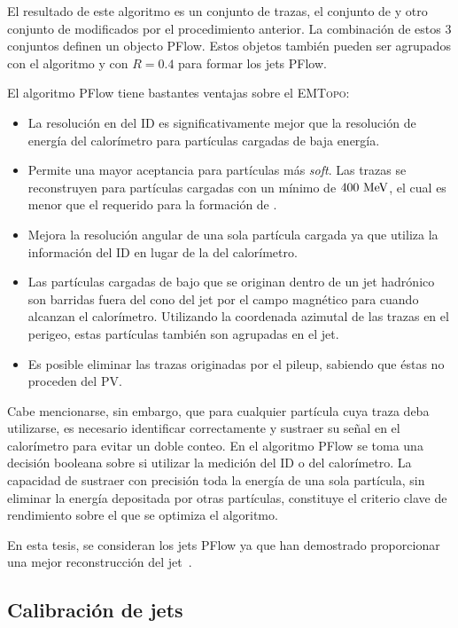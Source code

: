 El resultado de este algoritmo es un conjunto de trazas, el conjunto de \topos y otro conjunto de \topos modificados por el procedimiento anterior. La combinación de estos 3 conjuntos definen un objecto \ac{PFlow}. Estos objetos también pueden ser agrupados con el algoritmo \antikt y con \(R=0.4\) para formar los jets \ac{PFlow}.

El algoritmo \ac{PFlow} tiene bastantes ventajas sobre el \textsc{EMTopo}:
\begin{itemize}
    \item La resolución en \pt del \ac{ID} es significativamente mejor que la resolución de energía del calorímetro para partículas cargadas de baja energía.
    \item Permite una mayor aceptancia para partículas más \textit{soft}. Las trazas se reconstruyen para partículas cargadas con un mínimo \pt de \(400~\text{MeV}\), el cual es menor que el requerido para la formación de \topos.
    \item Mejora la resolución angular de una sola partícula cargada ya que utiliza la información del \ac{ID} en lugar de la del calorímetro.
    \item Las partículas cargadas de bajo \pt que se originan dentro de un jet hadrónico son barridas fuera del cono del jet por el campo magnético para cuando alcanzan el calorímetro. Utilizando la coordenada azimutal de las trazas en el perigeo, estas partículas también son agrupadas en el jet.
    \item Es posible eliminar las trazas originadas por el pileup, sabiendo que éstas no proceden del \ac{PV}.
\end{itemize}

Cabe mencionarse, sin embargo, que para cualquier partícula cuya traza deba utilizarse, es necesario identificar correctamente y sustraer su señal en el calorímetro para evitar un doble conteo. En el algoritmo \ac{PFlow} se toma una decisión booleana sobre si utilizar la medición del \ac{ID} o del calorímetro. La capacidad de sustraer con precisión toda la energía de una sola partícula, sin eliminar la energía depositada por otras partículas, constituye el criterio clave de rendimiento sobre el que se optimiza el algoritmo.

En esta tesis, se consideran los jets \ac{PFlow} ya que han demostrado proporcionar una mejor reconstrucción del jet~\cite{ATLAS-JetPFlow-Performance}.


\subsection{Calibración de jets}

